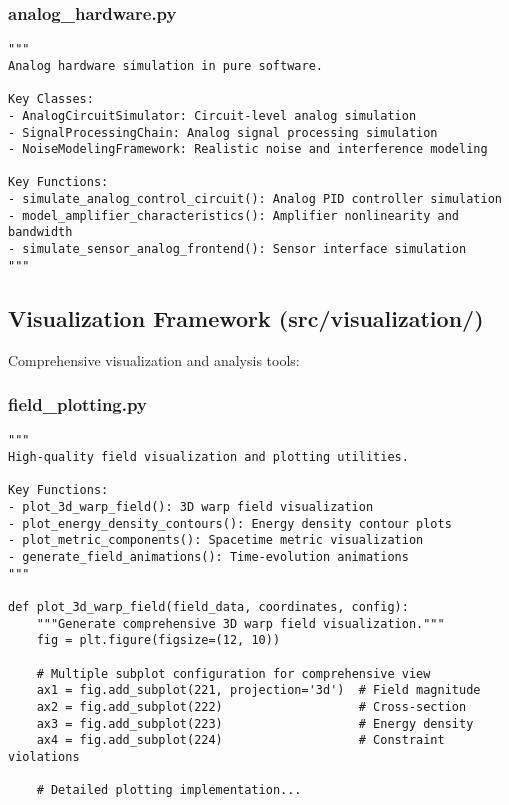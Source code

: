 \documentclass{article}
\begin{document}
\subsubsection{analog\_hardware.py}
\begin{lstlisting}
"""
Analog hardware simulation in pure software.

Key Classes:
- AnalogCircuitSimulator: Circuit-level analog simulation
- SignalProcessingChain: Analog signal processing simulation
- NoiseModelingFramework: Realistic noise and interference modeling

Key Functions:
- simulate_analog_control_circuit(): Analog PID controller simulation
- model_amplifier_characteristics(): Amplifier nonlinearity and bandwidth
- simulate_sensor_analog_frontend(): Sensor interface simulation
"""
\end{lstlisting}

\subsection{Visualization Framework (src/visualization/)}

Comprehensive visualization and analysis tools:

\subsubsection{field\_plotting.py}
\begin{lstlisting}
"""
High-quality field visualization and plotting utilities.

Key Functions:
- plot_3d_warp_field(): 3D warp field visualization
- plot_energy_density_contours(): Energy density contour plots
- plot_metric_components(): Spacetime metric visualization
- generate_field_animations(): Time-evolution animations
"""

def plot_3d_warp_field(field_data, coordinates, config):
    """Generate comprehensive 3D warp field visualization."""
    fig = plt.figure(figsize=(12, 10))
    
    # Multiple subplot configuration for comprehensive view
    ax1 = fig.add_subplot(221, projection='3d')  # Field magnitude
    ax2 = fig.add_subplot(222)                   # Cross-section
    ax3 = fig.add_subplot(223)                   # Energy density
    ax4 = fig.add_subplot(224)                   # Constraint violations
    
    # Detailed plotting implementation...
\end{lstlisting}
\end{document}
